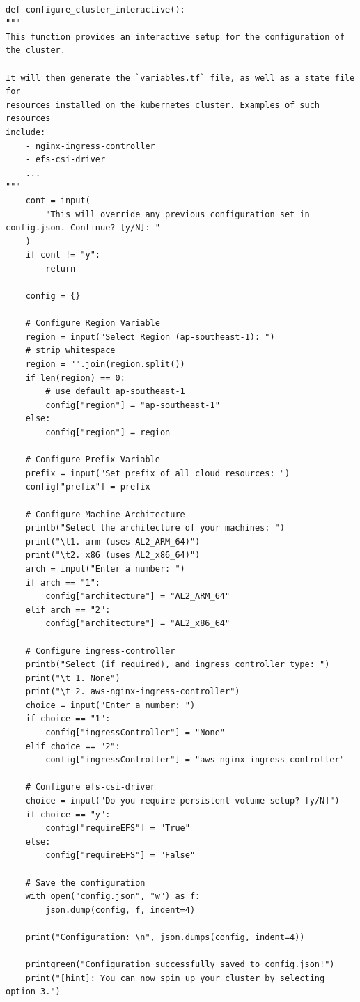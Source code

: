 \begin{lstlisting}[xleftmargin=10pt, caption={Interactive cluster configuration wizard}, label={lst:configure-cluster-wizard}]

def configure_cluster_interactive():
"""
This function provides an interactive setup for the configuration of
the cluster.

It will then generate the `variables.tf` file, as well as a state file for
resources installed on the kubernetes cluster. Examples of such resources
include:
    - nginx-ingress-controller
    - efs-csi-driver
    ...
"""
    cont = input(
        "This will override any previous configuration set in config.json. Continue? [y/N]: "
    )
    if cont != "y":
        return

    config = {}

    # Configure Region Variable
    region = input("Select Region (ap-southeast-1): ")
    # strip whitespace
    region = "".join(region.split())
    if len(region) == 0:
        # use default ap-southeast-1
        config["region"] = "ap-southeast-1"
    else:
        config["region"] = region

    # Configure Prefix Variable
    prefix = input("Set prefix of all cloud resources: ")
    config["prefix"] = prefix

    # Configure Machine Architecture
    printb("Select the architecture of your machines: ")
    print("\t1. arm (uses AL2_ARM_64)")
    print("\t2. x86 (uses AL2_x86_64)")
    arch = input("Enter a number: ")
    if arch == "1":
        config["architecture"] = "AL2_ARM_64"
    elif arch == "2":
        config["architecture"] = "AL2_x86_64"

    # Configure ingress-controller
    printb("Select (if required), and ingress controller type: ")
    print("\t 1. None")
    print("\t 2. aws-nginx-ingress-controller")
    choice = input("Enter a number: ")
    if choice == "1":
        config["ingressController"] = "None"
    elif choice == "2":
        config["ingressController"] = "aws-nginx-ingress-controller"

    # Configure efs-csi-driver
    choice = input("Do you require persistent volume setup? [y/N]")
    if choice == "y":
        config["requireEFS"] = "True"
    else:
        config["requireEFS"] = "False"

    # Save the configuration
    with open("config.json", "w") as f:
        json.dump(config, f, indent=4)

    print("Configuration: \n", json.dumps(config, indent=4))

    printgreen("Configuration successfully saved to config.json!")
    print("[hint]: You can now spin up your cluster by selecting option 3.")

\end{lstlisting}

